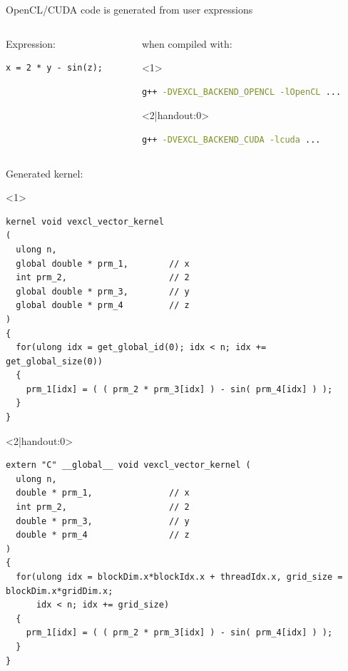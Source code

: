 \documentclass[@BEAMER_OPTIONS@]{beamer}
\begin{document}
\begin{frame}[fragile]{OpenCL/CUDA code is generated from user expressions}
    \begin{columns}
        \begin{column}{0.38\textwidth}
            \begin{exampleblock}{Expression:}
                \begin{lstlisting}
x = 2 * y - sin(z);
                \end{lstlisting}
            \end{exampleblock}
        \end{column}
        \begin{column}{0.55\textwidth}
            \begin{exampleblock}{when compiled with:}
                \begin{onlyenv}<1>
                    \begin{lstlisting}[language=bash,numbers=none]
g++ -DVEXCL_BACKEND_OPENCL -lOpenCL ...
                    \end{lstlisting}
                \end{onlyenv}
                \begin{onlyenv}<2|handout:0>
                    \begin{lstlisting}[language=bash,numbers=none]
g++ -DVEXCL_BACKEND_CUDA -lcuda ...
                    \end{lstlisting}
                \end{onlyenv}
            \end{exampleblock}
        \end{column}
    \end{columns}
    \begin{exampleblock}{Generated kernel:}
        \begin{onlyenv}<1>
            \begin{lstlisting}
kernel void vexcl_vector_kernel
(
  ulong n,
  global double * prm_1,        // x
  int prm_2,                    // 2
  global double * prm_3,        // y
  global double * prm_4         // z
)
{
  for(ulong idx = get_global_id(0); idx < n; idx += get_global_size(0))
  {
    prm_1[idx] = ( ( prm_2 * prm_3[idx] ) - sin( prm_4[idx] ) );
  }
}
            \end{lstlisting}
        \end{onlyenv}
        \begin{onlyenv}<2|handout:0>
            \begin{lstlisting}
extern "C" __global__ void vexcl_vector_kernel (
  ulong n,
  double * prm_1,               // x
  int prm_2,                    // 2
  double * prm_3,               // y
  double * prm_4                // z
)
{
  for(ulong idx = blockDim.x*blockIdx.x + threadIdx.x, grid_size = blockDim.x*gridDim.x;
      idx < n; idx += grid_size)
  {
    prm_1[idx] = ( ( prm_2 * prm_3[idx] ) - sin( prm_4[idx] ) );
  }
}
            \end{lstlisting}
        \end{onlyenv}
    \end{exampleblock}
\end{frame}
\end{document}
